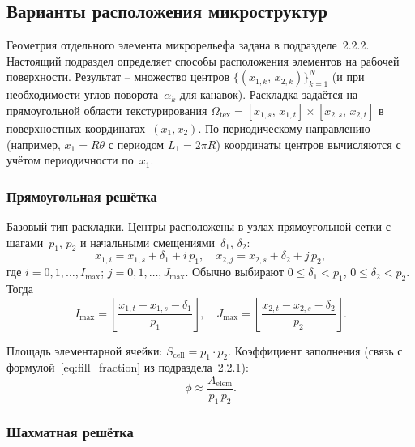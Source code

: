 \subsection{Варианты расположения микроструктур}

Геометрия отдельного элемента микрорельефа задана
в подразделе~2.2.2. Настоящий подраздел определяет способы
расположения элементов на рабочей поверхности. Результат --
множество центров $\{(x_{1,k},\, x_{2,k})\}_{k=1}^{N}$ (и при
необходимости углов поворота~$\alpha_k$ для канавок). Раскладка
задаётся на прямоугольной области текстурирования
$\Omega_{\mathrm{tex}}
  = [x_{1,s},\, x_{1,t}] \times [x_{2,s},\, x_{2,t}]$
в поверхностных координатах~$(x_1, x_2)$. По периодическому
направлению (например, $x_1 = R\theta$ с периодом $L_1 = 2\pi R$)
координаты центров вычисляются с учётом периодичности по~$x_1$.


\subsubsection*{Прямоугольная решётка}

Базовый тип раскладки. Центры расположены в узлах прямоугольной
сетки с шагами~$p_1$, $p_2$ и начальными смещениями~$\delta_1$,
$\delta_2$:
\begin{equation}
  x_{1,i} = x_{1,s} + \delta_1 + i\,p_1, \quad
  x_{2,j} = x_{2,s} + \delta_2 + j\,p_2,
  \label{eq:layout_rect}
\end{equation}
где $i = 0, 1, \ldots, I_{\max}$; $j = 0, 1, \ldots, J_{\max}$.
Обычно выбирают $0 \leq \delta_1 < p_1$,
$0 \leq \delta_2 < p_2$. Тогда
\[
  I_{\max}
    = \left\lfloor \frac{x_{1,t} - x_{1,s} - \delta_1}{p_1} \right\rfloor,
  \quad
  J_{\max}
    = \left\lfloor \frac{x_{2,t} - x_{2,s} - \delta_2}{p_2} \right\rfloor.
\]

Площадь элементарной ячейки:
$S_{\mathrm{cell}} = p_1 \cdot p_2$.
Коэффициент заполнения (связь с формулой~\eqref{eq:fill_fraction}
из подраздела~2.2.1):
\begin{equation}
  \phi \approx \frac{A_{\mathrm{elem}}}{p_1\,p_2}.
  \label{eq:fill_rect}
\end{equation}


\subsubsection*{Шахматная решётка}

